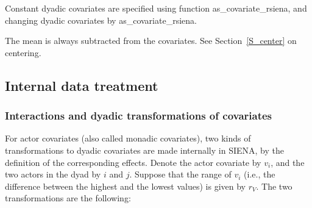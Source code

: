 \documentclass[a4paper,fleqn,11pt]{article}
\newcommand{\+}{\, + \,}
\newcommand{\sfn}[1]{\textsf{#1}}
\newcommand{\si}{{\sf SIENA}}
\begin{document}
Constant dyadic covariates are specified using function
\sfn{as\_covariate\_rsiena}, and changing dyadic covariates by \sfn{as\_covariate\_rsiena}.

The mean is always subtracted from the covariates.
See Section~\ref{S_center} on centering.

\subsection{Internal data treatment}
\label{S_internal}

\subsubsection{Interactions and dyadic transformations of covariates}

For actor covariates (also called monadic covariates),
two kinds of transformations to dyadic covariates
are made internally in \si, by the definition of the
corresponding effects. Denote the actor covariate by $v_i$,
and the two actors in the dyad by $i$ and $j$.
Suppose that the range of $v_i$ (i.e., the difference between the
highest and the lowest values) is given by $r_V$.
The two transformations are the following:
\end{document}
